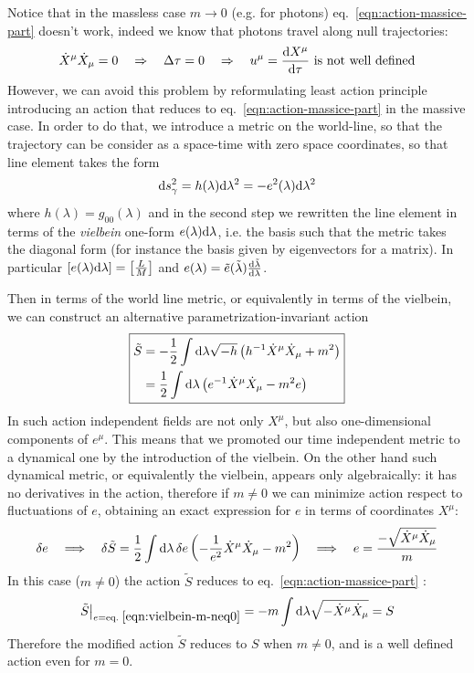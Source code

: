\documentclass[../main/main.tex]{subfiles}
\begin{document}
Notice that in the massless case $m\to0$ (e.g. for photons) eq.~\eqref{eqn:action-massice-part} doesn't work, indeed we know that photons travel along null trajectories:
\[\dot X^\mu\dot X_\mu=0\quad\Rightarrow\quad \Delta\tau=0\quad\Rightarrow\quad u^\mu=\frac{\textup{d} X^\mu}{\textup{d}\tau}\text{ is not well defined}\]
However, we can avoid this problem by reformulating least action principle introducing an action that reduces to eq.~\eqref{eqn:action-massice-part} in the massive case. In order to do that, we introduce a metric on the world-line, so that the trajectory can be consider as a space-time with zero space coordinates, so that line element takes the form
\[\textup{d} s^2_\gamma=h(\lambda)\textup{d}\lambda^2=-e^2(\lambda)\textup{d}\lambda^2\]
where $h(\lambda)=g_{00}(\lambda)$ and in the second step we rewritten the line element in terms of the \emph{vielbein} one-form $e(\lambda)\textup{d}\lambda$, i.e. the basis such that the metric takes the diagonal form (for instance the basis given by eigenvectors for a matrix). In particular $[e(\lambda)\textup{d}\lambda]=\left[\frac LM\right]$ and $e(\lambda)=\tilde e(\tilde\lambda)\frac{\textup{d}\tilde\lambda}{\textup{d}\lambda}$.

Then in terms of the world line metric, or equivalently in terms of the vielbein, we can construct an alternative parametrization-invariant action
\begin{equation}\label{eqn:modif-action-flat}
\boxed{
\begin{split}
\tilde S&=-\frac12\int\textup{d}\lambda\sqrt{-h}\left(h^{-1}\dot X^\mu\dot X_\mu+m^2\right)\\
&=\frac12\int\textup{d}\lambda\left(e^{-1}\dot X^\mu\dot X_\mu-m^2e\right)
\end{split}
}
\end{equation}
In such action independent fields are not only $X^\mu$, but also one-dimensional components of $e^\mu$. This means that we promoted our time independent metric to a dynamical one by the introduction of the vielbein. On the other hand such dynamical metric, or equivalently the vielbein, appears only algebraically: it has no derivatives in the action, therefore if $m\neq0$ we can minimize action respect to fluctuations of $e$, obtaining an exact expression for $e$ in terms of coordinates $X^\mu$:
\begin{equation}\label{eqn:vielbein-m-neq0}
\delta e\quad\Longrightarrow\quad \delta \tilde S=\frac12\int\textup{d}\lambda\,\delta e\left(-\frac1{e^2}\dot X^\mu\dot X_\mu-m^2\right)\quad\Longrightarrow\quad e=\frac{-\sqrt{\dot X^\mu\dot X_\mu}}m
\end{equation}
In this case ($m\neq0$) the action $\tilde S$ reduces to eq.~\eqref{eqn:action-massice-part} :
\[\tilde S\big\vert_{e=\text{eq.~}\eqref{eqn:vielbein-m-neq0}}=-m\int\textup{d}\lambda\sqrt{-\dot X^\mu\dot X_\mu}=S\]
Therefore the modified action $\tilde S$ reduces to $S$ when $m\neq0$, and is a well defined action even for $m=0$. 
\end{document}
